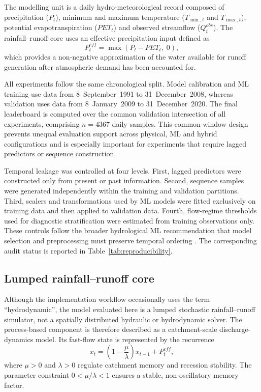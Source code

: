 The modelling unit is a daily hydro-meteorological record composed of
precipitation ($P_t$), minimum and maximum temperature
($T_{\min,t}$ and $T_{\max,t}$), potential evapotranspiration
($PET_t$) and observed streamflow ($Q^{obs}_t$). The rainfall--runoff
core uses an effective precipitation input defined as
\begin{equation}
P^{eff}_t = \max(P_t - PET_t,\;0),
\label{eq:peff}
\end{equation}
which provides a non-negative approximation of the water available for
runoff generation after atmospheric demand has been accounted for.

All experiments follow the same chronological split. Model calibration
and ML training use data from 8~September~1991 to 31~December~2008,
whereas validation uses data from 8~January~2009 to 31~December~2020.
The final leaderboard is computed over the common validation
intersection of all experiments, comprising $n=4367$ daily samples. This
common-window design prevents unequal evaluation support across
physical, ML and hybrid configurations and is especially important for
experiments that require lagged predictors or sequence construction.

Temporal leakage was controlled at four levels. First, lagged predictors
were constructed only from present or past information. Second,
sequence samples were generated independently within the training and
validation partitions. Third, scalers and transformations used by ML
models were fitted exclusively on training data and then applied to
validation data. Fourth, flow-regime thresholds used for diagnostic
stratification were estimated from training observations only. These
controls follow the broader hydrological ML recommendation that model
selection and preprocessing must preserve temporal ordering
\citep{arsenault2022continuous,chen2013finding}. The corresponding
audit status is reported in Table~\ref{tab:reproducibility}.

\subsection{Lumped rainfall--runoff core}\label{subsec:physical-core}

Although the implementation workflow occasionally uses the term
``hydrodynamic'', the model evaluated here is a lumped stochastic
rainfall--runoff simulator, not a spatially distributed hydraulic or
hydrodynamic solver. The process-based component is therefore described
as a catchment-scale discharge-dynamics model. Its fast-flow state is
represented by the recurrence
\begin{equation}
x_t = \left(1 - \frac{\mu}{\lambda}\right)x_{t-1} + P^{eff}_t,
\label{eq:ramis-state}
\end{equation}
where $\mu>0$ and $\lambda>0$ regulate catchment memory and recession
stability. The parameter constraint $0<\mu/\lambda<1$ ensures a stable,
non-oscillatory memory factor.

